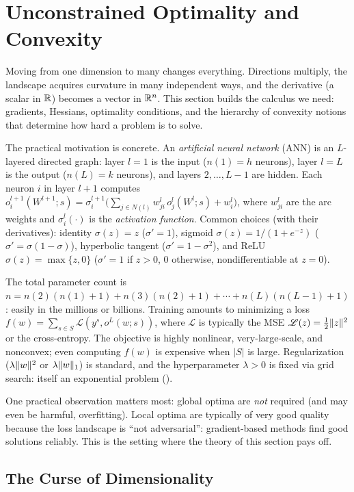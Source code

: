 \section{Unconstrained Optimality and Convexity}\label{sec:optimality}

Moving from one dimension to many changes everything.
Directions multiply, the landscape acquires curvature in many independent ways, and the derivative (a scalar in $\mathbb{R}$) becomes a vector in $\mathbb{R}^n$.
This section builds the calculus we need: gradients, Hessians, optimality conditions, and the hierarchy of convexity notions that determine how hard a problem is to solve.

The practical motivation is concrete.
An \emph{artificial neural network} (ANN) is an $L$-layered directed graph: layer $l = 1$ is the input ($n(1) = h$ neurons), layer $l = L$ is the output ($n(L) = k$ neurons), and layers $2, \dots, L-1$ are hidden.
Each neuron $i$ in layer $l+1$ computes
$o_i^{l+1}(W^{l+1}; s) = \sigma_i^{l+1}\bigl(\sum_{j \in N(l)} w_{ji}^l\, o_j^l(W^l; s) + w_i^l\bigr)$,
where $w_{ji}^l$ are the arc weights and $\sigma_i^l(\cdot)$ is the \emph{activation function}.
Common choices (with their derivatives): identity $\sigma(z) = z$ ($\sigma' = 1$), sigmoid $\sigma(z) = 1/(1 + e^{-z})$ ($\sigma' = \sigma(1 - \sigma)$), hyperbolic tangent ($\sigma' = 1 - \sigma^2$), and ReLU $\sigma(z) = \max\{z, 0\}$ ($\sigma' = 1$ if $z > 0$, $0$ otherwise, nondifferentiable at $z = 0$).

The total parameter count is $n = n(2)(n(1) + 1) + n(3)(n(2) + 1) + \cdots + n(L)(n(L-1) + 1)$: easily in the millions or billions.
Training amounts to minimizing a loss $f(w) = \sum_{s \in S} \mathcal{L}(y^s, o^L(w; s))$, where $\mathcal{L}$ is typically the MSE $\mathcal{L}(z) = \frac{1}{2}\lVert z\rVert^2$ or the cross-entropy.
The objective is highly nonlinear, very-large-scale, and nonconvex; even computing $f(w)$ is expensive when $|S|$ is large.
Regularization ($\lambda\lVert w\rVert^2$ or $\lambda\lVert w\rVert_1$) is standard, and the hyperparameter $\lambda > 0$ is fixed via grid search: itself an exponential problem ().

One practical observation matters most: global optima are \emph{not} required (and may even be harmful, overfitting).
Local optima are typically of very good quality because the loss landscape is ``not adversarial'': gradient-based methods find good solutions reliably.
This is the setting where the theory of this section pays off.


\subsection{The Curse of Dimensionality}\label{sec:curse-dim}

